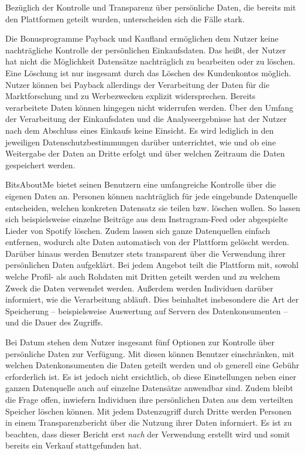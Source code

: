 \noindent Bezüglich der Kontrolle und Transparenz über persönliche Daten, die bereits mit den Plattformen geteilt wurden, unterscheiden sich die Fälle stark. \newline

\noindent Die Bonusprogramme Payback und Kaufland ermöglichen dem Nutzer keine nachträgliche Kontrolle der persönlichen Einkaufsdaten. Das heißt, der Nutzer hat nicht die Möglichkeit Datensätze nachträglich zu bearbeiten oder zu löschen. Eine Löschung ist nur insgesamt durch das Löschen des Kundenkontos möglich. Nutzer können bei Payback allerdings der Verarbeitung der Daten für die Marktforschung und zu Werbezwecken explizit widersprechen. Bereits verarbeitete Daten können hingegen nicht widerrufen werden. Über den Umfang der Verarbeitung der Einkaufsdaten und die Analyseergebnisse hat der Nutzer nach dem Abschluss eines Einkaufs keine Einsicht. Es wird lediglich in den jeweiligen Datenschutzbestimmungen darüber unterrichtet, wie und ob eine Weitergabe der Daten an Dritte erfolgt und über welchen Zeitraum die Daten gespeichert werden. \newline

\noindent BitsAboutMe bietet seinen Benutzern eine umfangreiche Kontrolle über die eigenen Daten an. Personen können nachträglich für jede eingebunde Datenquelle entscheiden, welchen konkreten Datensatz sie teilen bzw. löschen wollen. So lassen sich beispielsweise einzelne Beiträge aus dem Instragram-Feed oder abgespielte Lieder von Spotify löschen. Zudem lassen sich ganze Datenquellen einfach entfernen, wodurch alte Daten automatisch von der Plattform gelöscht werden. Darüber hinaus werden Benutzer stets transparent über die Verwendung ihrer persönlichen Daten aufgeklärt. Bei jedem Angebot teilt die Plattform mit, sowohl welche Profil- als auch Rohdaten mit Dritten geteilt werden und zu welchem Zweck die Daten verwendet werden. Außerdem werden Individuen darüber informiert, wie die Verarbeitung abläuft. Dies beinhaltet insbesondere die Art der Speicherung -- beispielsweise Auswertung auf Servern des Datenkonsumenten -- und die Dauer des Zugriffs. \newline

\noindent Bei Datum stehen dem Nutzer insgesamt fünf Optionen zur Kontrolle über persönliche Daten zur Verfügung. Mit diesen können Benutzer einschränken, mit welchen Datenkonsumenten die Daten geteilt werden und ob generell eine Gebühr erforderlich ist. Es ist jedoch nicht ersichtlich, ob diese Einstellungen neben einer ganzen Datenquelle auch auf einzelne Datensätze anwendbar sind. Zudem bleibt die Frage offen, inwiefern Individuen ihre persönlichen Daten aus dem verteilten Speicher löschen können. Mit jedem Datenzugriff durch Dritte werden Personen in einem Transparenzbericht über die Nutzung ihrer Daten informiert. Es ist zu beachten, dass dieser Bericht erst \textit{nach} der Verwendung erstellt wird und somit bereits ein Verkauf stattgefunden hat. \newline

